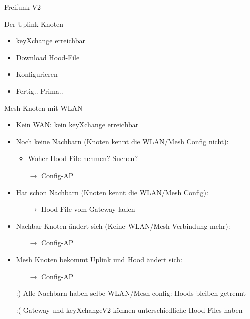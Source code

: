 \begin{frame}{Freifunk V2}
    \center
\end{frame}

\begin{frame}{Der Uplink Knoten}
    \begin{itemize}
        \item keyXchange erreichbar
        \item Download Hood-File
        \item Konfigurieren
        \item Fertig.. Prima..
    \end{itemize}
\end{frame}

\begin{frame}{Mesh Knoten mit WLAN}
    \begin{itemize}
        \item Kein WAN: kein keyXchange erreichbar
        \item Noch keine Nachbarn (Knoten kennt die WLAN/Mesh Config nicht):
        \begin{itemize}
            \item Woher Hood-File nehmen? Suchen?
            \item[$\rightarrow$] Config-AP
        \end{itemize}
        \item Hat schon Nachbarn (Knoten kennt die WLAN/Mesh Config):
        \begin{itemize}
            \item[$\rightarrow$] Hood-File vom Gateway laden
        \end{itemize}
        \item Nachbar-Knoten ändert sich (Keine WLAN/Mesh Verbindung mehr):
        \begin{itemize}
            \item[$\rightarrow$] Config-AP
        \end{itemize}
        \item Mesh Knoten bekommt Uplink und Hood ändert sich:
        \begin{itemize}
            \item[$\rightarrow$] Config-AP
        \end{itemize}
        \item[:)] Alle Nachbarn haben selbe WLAN/Mesh config: Hoods bleiben getrennt
        \item[:(] Gateway und keyXchangeV2 können unterschiedliche Hood-Files haben
    \end{itemize}
\end{frame}

